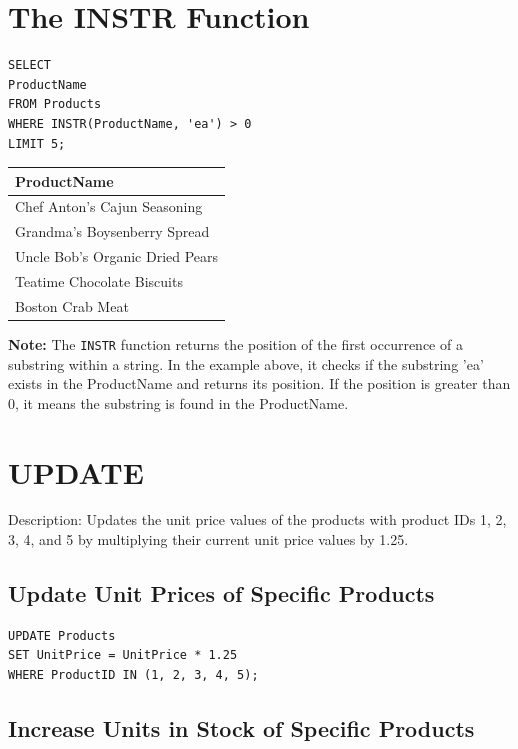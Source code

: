 \documentclass[10pt]{article}
\begin{document}
\section{The INSTR Function}

\begin{verbatim}
SELECT 
ProductName
FROM Products
WHERE INSTR(ProductName, 'ea') > 0
LIMIT 5;
\end{verbatim}

\begin{table}[H]
\begin{tabular}{|l|}
\hline
ProductName \\
\hline
Chef Anton's Cajun Seasoning \\
Grandma's Boysenberry Spread \\
Uncle Bob's Organic Dried Pears \\
Teatime Chocolate Biscuits \\
Boston Crab Meat \\
\hline
\end{tabular}
\end{table}

\noindent \textbf{Note:} The \texttt{INSTR} function returns the position of the first occurrence of a substring within a string.
In the example above, it checks if the substring 'ea' exists in the ProductName and returns its position. 
If the position is greater than 0, it means the substring is found in the ProductName.



\section{UPDATE}

Description: Updates the unit price values of the products 
with product IDs 1, 2, 3, 4, and 5 by multiplying their current unit price values by 1.25.

\subsection{Update Unit Prices of Specific Products}
\begin{verbatim}
UPDATE Products
SET UnitPrice = UnitPrice * 1.25
WHERE ProductID IN (1, 2, 3, 4, 5);
\end{verbatim}

\subsection{Increase Units in Stock of Specific Products}
\end{document}
